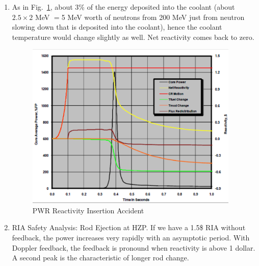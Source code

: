 \documentclass{school-22.211-notes}
\begin{document}
\begin{enumerate}
\clearpage
\item As in Fig.~\ref{fn4}, about 3\% of the energy deposited into the coolant (about $2.5 \times 2$ MeV $=$5 MeV worth of neutrons from 200 MeV just from neutron slowing down that is deposited into the coolant), hence the coolant temperature would change slightly as well. Net reactivity comes back to zero.
  \begin{figure}[ht] 
    \centering
    \includegraphics[width=4in]{images/pke/fn4.png}
    \caption{PWR Reactivity Insertion Accident} \label{fn4}
  \end{figure}

\item RIA Safety Analysis: Rod Ejection at HZP. If we have a 1.5\$ RIA without feedback, the power increases very rapidly with an asymptotic period. With Doppler feedback, the feedback is pronound when reactivity is above 1 dollar. A second peak is the characteristic of longer rod change. 
\end{enumerate}
\end{document}

